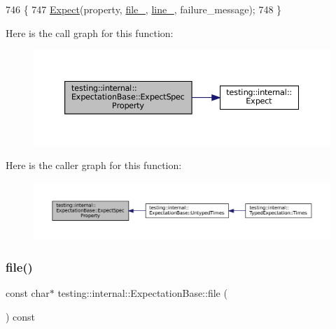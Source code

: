 \begin{DoxyCode}
746                                                                               \{
747     \hyperlink{namespacetesting_1_1internal_ab3000fc56be000e4fa6ed7cdcfee3106}{Expect}(property, \hyperlink{classtesting_1_1internal_1_1ExpectationBase_afabf690537298bbb84e9b443f62d7e97}{file\_}, \hyperlink{classtesting_1_1internal_1_1ExpectationBase_ab8143119e4b686ff1bb6c985924da57a}{line\_}, failure\_message);
748   \}
\end{DoxyCode}
Here is the call graph for this function\+:
\nopagebreak
\begin{figure}[H]
\begin{center}
\leavevmode
\includegraphics[width=350pt]{classtesting_1_1internal_1_1ExpectationBase_a652adbe3fcca2950175e3859d59af268_cgraph}
\end{center}
\end{figure}
Here is the caller graph for this function\+:
\nopagebreak
\begin{figure}[H]
\begin{center}
\leavevmode
\includegraphics[width=350pt]{classtesting_1_1internal_1_1ExpectationBase_a652adbe3fcca2950175e3859d59af268_icgraph}
\end{center}
\end{figure}
\mbox{\label{classtesting_1_1internal_1_1ExpectationBase_ad8aae77623dbddd5d2099ea6499eda53}} 
\subsubsection{\texorpdfstring{file()}{file()}}
{\footnotesize\ttfamily const char$\ast$ testing\+::internal\+::\+Expectation\+Base\+::file (\begin{DoxyParamCaption}{ }\end{DoxyParamCaption}) const\hspace{0.3cm}{\ttfamily [inline]}}



